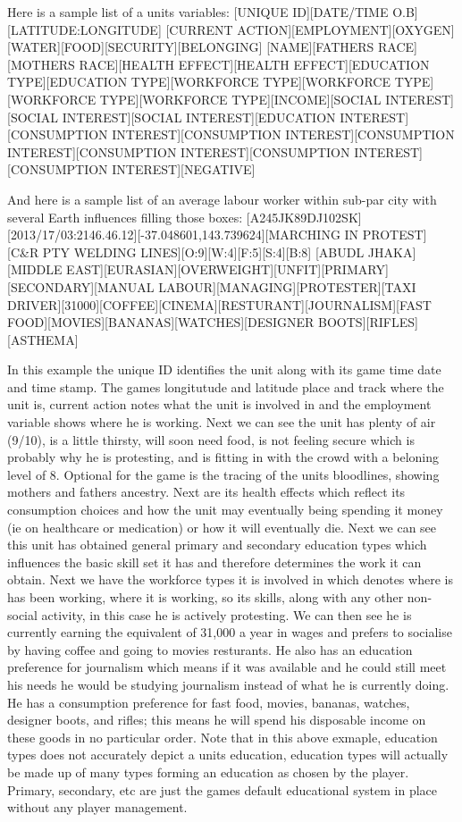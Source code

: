 Here is a sample list of a units variables:
[UNIQUE ID][DATE/TIME O.B][LATITUDE:LONGITUDE]
[CURRENT ACTION][EMPLOYMENT][OXYGEN][WATER][FOOD][SECURITY][BELONGING]
[NAME][FATHERS RACE][MOTHERS RACE][HEALTH EFFECT][HEALTH EFFECT][EDUCATION TYPE][EDUCATION TYPE][WORKFORCE TYPE][WORKFORCE TYPE]
[WORKFORCE TYPE][WORKFORCE TYPE][INCOME][SOCIAL INTEREST][SOCIAL INTEREST][SOCIAL INTEREST][EDUCATION INTEREST][CONSUMPTION INTEREST][CONSUMPTION INTEREST][CONSUMPTION INTEREST][CONSUMPTION INTEREST][CONSUMPTION INTEREST][CONSUMPTION INTEREST][NEGATIVE]

And here is a sample list of an average labour worker within sub-par city with several Earth influences filling those boxes:
[A245JK89DJ102SK][2013/17/03:2146.46.12][-37.048601,143.739624][MARCHING IN PROTEST][C&R PTY WELDING LINES][O:9][W:4][F:5][S:4][B:8]
[ABUDL JHAKA][MIDDLE EAST][EURASIAN][OVERWEIGHT][UNFIT][PRIMARY][SECONDARY][MANUAL LABOUR][MANAGING][PROTESTER][TAXI DRIVER][31000][COFFEE][CINEMA][RESTURANT][JOURNALISM][FAST FOOD][MOVIES][BANANAS][WATCHES][DESIGNER BOOTS][RIFLES][ASTHEMA]



In this example the unique ID identifies the unit along with its game time date and time stamp. The games longitutude and latitude place and track where the unit is, current action notes what the unit is involved in and the employment variable shows where he is working.
Next we can see the unit has plenty of air (9/10), is a little thirsty, will soon need food, is not feeling secure which is probably why he is protesting, and is fitting in with the crowd with a beloning level of 8. Optional for the game is the tracing of the units bloodlines, showing mothers and fathers ancestry. Next are its health effects which reflect its consumption choices and how the unit may eventually being spending it money (ie on healthcare or medication) or how it will eventually die. Next we can see this unit has obtained general primary and secondary education types which influences the basic skill set it has and therefore determines the work it can obtain. Next we have the workforce types it is involved in which denotes where is has been working, where it is working, so its skills, along with any other non-social activity, in this case he is actively protesting. We can then see he is currently earning the equivalent of 31,000 a year in wages and prefers to socialise by having coffee and going to movies resturants. He also has an education preference for journalism which means if it was available and he could still meet his needs he would be studying journalism instead of what he is currently doing. He has 
a consumption preference for fast food, movies, bananas, watches, designer boots, and rifles; this means he will spend his disposable income on these goods in no particular order. Note that in this above exmaple, education types does not accurately depict a units education, education types will actually be made up of many types forming an education as chosen by the player. Primary, secondary, etc are just the games default educational system in place without any player management.

